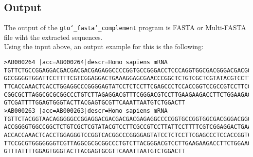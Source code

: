 \subsection*{Output}
The output of the \texttt{gto\char`_fasta\char`_complement} program is FASTA or Multi-FASTA file wiht the extracted sequences.\\
Using the input above, an output example for this is the following:
\begin{lstlisting}
>AB000264 |acc=AB000264|descr=Homo sapiens mRNA 
TGTTCTGCCGGAGGACGACGACGACGAGAGGCCCCGGTGCCGGGACCTCCCAGGTGGCGACGGGACGACGGTAACAGGG
GCCGGGGTGGATTCCTTTTCGTCGGAGGACTGAAAGGAGCGAACCCGGCTCTGTCGCTCGTATACGTCCTTCGCCGTCC
TTCACCAAACTCACCTGGAGGCCCGGGGAGTATCCTCTCCTTCGAGCCCTCCACCGGTCCGCCGTCCTTCGTCCGGTCA
CGGCGCTTAGGCGCGCGGCCCTGTCTTAGAGGACGTTTCGGGACGTCCTTGAAGAAGACCTTCTGGAAGAGGTGGGGGG
GTCGATTTTGGAGTGGGTACTTACGAGTGCGTTCAAATTAATGTCTGGACTT
>AB000263 |acc=AB000263|descr=Homo sapiens mRNA 
TGTTCTACGGTAACAGGGGGCCGGAGGACGACGACGACGAGAGGCCCCGGTGCCGGTGGCGACGGGACGGGGACCTCCC
ACCGGGGTGGCCGGCTCTGTCGCTCGTATACGTCCTTCGCCGTCCTTATTCCTTTTCGTCGGAGGACTGAAAGGAGCGA
ACCACCAAACTCACCTGGAGGGTCCGGTCACGGCCCGGGGAGTATCCTCTCCTTCGAGCCCTCCACCGGTCCGCCGTCC
TTCCGCGTGGGGGGGTCGTTAGGCGCGCGGCCCTGTCTTACGGGACGTCCTTGAAGAAGACCTTCTGGAAGAGGAGGAC
GTTTATTTTGGAGTGGGTACTTACGAGTGCGTTCAAATTAATGTCTGGACTT
\end{lstlisting}
